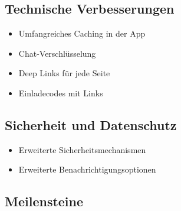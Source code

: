 \subsection{Technische Verbesserungen}
\begin{itemize}
    \item Umfangreiches Caching in der App
    \item Chat-Verschlüsselung
    \item Deep Links für jede Seite
    \item Einladecodes mit Links
\end{itemize}

\subsection{Sicherheit und Datenschutz}
\begin{itemize}
    \item Erweiterte Sicherheitsmechanismen
    \item Erweiterte Benachrichtigungsoptionen
\end{itemize}




\subsection{Meilensteine}

